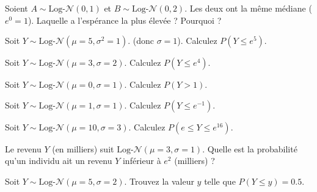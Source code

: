 \begin{exercicebox}
Soient $A \sim \text{Log-}\mathcal{N}(0, 1)$ et $B \sim \text{Log-}\mathcal{N}(0, 2)$.
Les deux ont la même médiane ($e^0=1$). Laquelle a l'espérance la plus élevée ? Pourquoi ?
\end{exercicebox}


\begin{exercicebox}
Soit $Y \sim \text{Log-}\mathcal{N}(\mu=5, \sigma^2=1)$. (donc $\sigma=1$).
Calculez $P(Y \le e^5)$.
\end{exercicebox}

\begin{exercicebox}
Soit $Y \sim \text{Log-}\mathcal{N}(\mu=3, \sigma=2)$.
Calculez $P(Y \le e^4)$.
\end{exercicebox}

\begin{exercicebox}
Soit $Y \sim \text{Log-}\mathcal{N}(\mu=0, \sigma=1)$.
Calculez $P(Y > 1)$.
\end{exercicebox}

\begin{exercicebox}
Soit $Y \sim \text{Log-}\mathcal{N}(\mu=1, \sigma=1)$.
Calculez $P(Y \le e^{-1})$.
\end{exercicebox}

\begin{exercicebox}
Soit $Y \sim \text{Log-}\mathcal{N}(\mu=10, \sigma=3)$.
Calculez $P(e \le Y \le e^{16})$.
\end{exercicebox}

\begin{exercicebox}
Le revenu $Y$ (en milliers) suit $\text{Log-}\mathcal{N}(\mu=3, \sigma=1)$.
Quelle est la probabilité qu'un individu ait un revenu $Y$ inférieur à $e^2$ (milliers) ?
\end{exercicebox}


\begin{exercicebox}
Soit $Y \sim \text{Log-}\mathcal{N}(\mu=5, \sigma=2)$. Trouvez la valeur $y$ telle que $P(Y \le y) = 0.5$.
\end{exercicebox}

